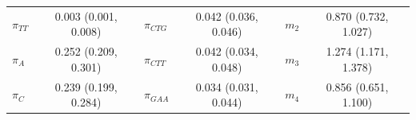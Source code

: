\documentclass{svmult}
\begin{document}
\begin{center}
\begin{tabular}{lc lc lc}
$\pi_{TT}$     & 0.003 (0.001, 0.008) & $\pi_{CTG}$    & 0.042 (0.036, 0.046) & $m_2$          & 0.870 (0.732, 1.027) \\
$\pi_{A}$      & 0.252 (0.209, 0.301) & $\pi_{CTT}$    & 0.042 (0.034, 0.048) & $m_3$          & 1.274 (1.171, 1.378) \\
$\pi_{C}$      & 0.239 (0.199, 0.284) & $\pi_{GAA}$    & 0.034 (0.031, 0.044) & $m_4$          & 0.856 (0.651, 1.100) \\ \hline
\end{tabular}
\end{center}

\clearpage

\end{document}
